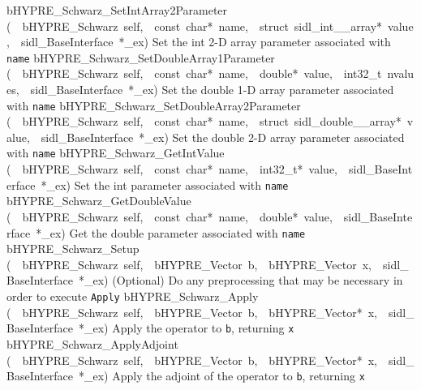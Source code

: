 \documentclass{article}
\begin{document}
\begin{cxxentry}
\begin{cxxentry}
\begin{cxxnames}
        {}
\label{cxx.6.4.20}
        {bHYPRE\_Schwarz\_SetIntArray2Parameter}
        {(\ \ bHYPRE\_Schwarz\ self,\ \ const\ char*\ name,\ \ struct\ sidl\_int\_\_array*\ value,\ \ sidl\_BaseInterface\ *\_ex)}
        {
Set the int 2-D array parameter associated with {\tt name}}
        {}
\label{cxx.6.4.21}
        {bHYPRE\_Schwarz\_SetDoubleArray1Parameter}
        {(\ \ bHYPRE\_Schwarz\ self,\ \ const\ char*\ name,\ \ double*\ value,\ \ int32\_t\ nvalues,\ \ sidl\_BaseInterface\ *\_ex)}
        {
Set the double 1-D array parameter associated with {\tt name}}
        {}
\label{cxx.6.4.22}
        {bHYPRE\_Schwarz\_SetDoubleArray2Parameter}
        {(\ \ bHYPRE\_Schwarz\ self,\ \ const\ char*\ name,\ \ struct\ sidl\_double\_\_array*\ value,\ \ sidl\_BaseInterface\ *\_ex)}
        {
Set the double 2-D array parameter associated with {\tt name}}
        {}
\label{cxx.6.4.23}
        {bHYPRE\_Schwarz\_GetIntValue}
        {(\ \ bHYPRE\_Schwarz\ self,\ \ const\ char*\ name,\ \ int32\_t*\ value,\ \ sidl\_BaseInterface\ *\_ex)}
        {
Set the int parameter associated with {\tt name}}
        {}
\label{cxx.6.4.24}
        {bHYPRE\_Schwarz\_GetDoubleValue}
        {(\ \ bHYPRE\_Schwarz\ self,\ \ const\ char*\ name,\ \ double*\ value,\ \ sidl\_BaseInterface\ *\_ex)}
        {
Get the double parameter associated with {\tt name}}
        {}
\label{cxx.6.4.25}
        {bHYPRE\_Schwarz\_Setup}
        {(\ \ bHYPRE\_Schwarz\ self,\ \ bHYPRE\_Vector\ b,\ \ bHYPRE\_Vector\ x,\ \ sidl\_BaseInterface\ *\_ex)}
        {
(Optional) Do any preprocessing that may be necessary in
order to execute {\tt Apply}}
        {}
\label{cxx.6.4.26}
        {bHYPRE\_Schwarz\_Apply}
        {(\ \ bHYPRE\_Schwarz\ self,\ \ bHYPRE\_Vector\ b,\ \ bHYPRE\_Vector*\ x,\ \ sidl\_BaseInterface\ *\_ex)}
        {
Apply the operator to {\tt b}, returning {\tt x}}
        {}
\label{cxx.6.4.27}
        {bHYPRE\_Schwarz\_ApplyAdjoint}
        {(\ \ bHYPRE\_Schwarz\ self,\ \ bHYPRE\_Vector\ b,\ \ bHYPRE\_Vector*\ x,\ \ sidl\_BaseInterface\ *\_ex)}
        {
Apply the adjoint of the operator to {\tt b}, returning {\tt x}}
        {}
\label{cxx.6.4.28}

\end{cxxnames}
\end{cxxentry}
\end{cxxentry}
\end{document}
